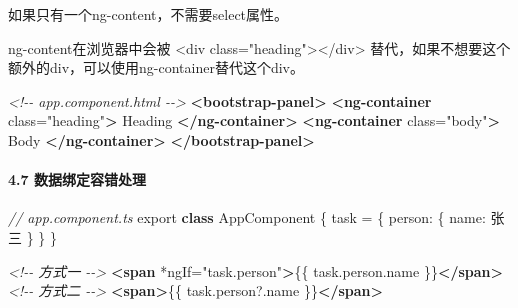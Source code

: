 \documentclass[
]{article}
\newenvironment{Shaded}{}{}
\newcommand{\CommentTok}[1]{\textcolor[rgb]{0.38,0.63,0.69}{\textit{#1}}}
\newcommand{\DataTypeTok}[1]{\textcolor[rgb]{0.56,0.13,0.00}{#1}}
\newcommand{\ImportTok}[1]{#1}
\newcommand{\KeywordTok}[1]{\textcolor[rgb]{0.00,0.44,0.13}{\textbf{#1}}}
\newcommand{\NormalTok}[1]{#1}
\newcommand{\OperatorTok}[1]{\textcolor[rgb]{0.40,0.40,0.40}{#1}}
\newcommand{\OtherTok}[1]{\textcolor[rgb]{0.00,0.44,0.13}{#1}}
\newcommand{\StringTok}[1]{\textcolor[rgb]{0.25,0.44,0.63}{#1}}
\begin{document}
如果只有一个ng-content，不需要select属性。

ng-content在浏览器中会被 \textless{}div
class="heading"\textgreater{}\textless{}/div\textgreater{}
替代，如果不想要这个额外的div，可以使用ng-container替代这个div。

\begin{Shaded}
\begin{Highlighting}[]
\CommentTok{\textless{}!{-}{-} app.component.html {-}{-}\textgreater{}}
\KeywordTok{\textless{}bootstrap{-}panel\textgreater{}}
	\KeywordTok{\textless{}ng{-}container}\OtherTok{ class=}\StringTok{"heading"}\KeywordTok{\textgreater{}}
\NormalTok{        Heading}
    \KeywordTok{\textless{}/ng{-}container\textgreater{}}
    \KeywordTok{\textless{}ng{-}container}\OtherTok{ class=}\StringTok{"body"}\KeywordTok{\textgreater{}}
\NormalTok{        Body}
    \KeywordTok{\textless{}/ng{-}container\textgreater{}}
\KeywordTok{\textless{}/bootstrap{-}panel\textgreater{}}
\end{Highlighting}
\end{Shaded}

\hypertarget{47--ux6570ux636eux7ed1ux5b9aux5bb9ux9519ux5904ux7406}{%
\paragraph{4.7
数据绑定容错处理}\label{47--ux6570ux636eux7ed1ux5b9aux5bb9ux9519ux5904ux7406}}

\begin{Shaded}
\begin{Highlighting}[]
\CommentTok{// app.component.ts}
\ImportTok{export} \KeywordTok{class}\NormalTok{ AppComponent \{}
\NormalTok{    task }\OperatorTok{=}\NormalTok{ \{}
        \DataTypeTok{person}\OperatorTok{:}\NormalTok{ \{}
            \DataTypeTok{name}\OperatorTok{:} \StringTok{\textquotesingle{}张三\textquotesingle{}}
\NormalTok{        \}}
\NormalTok{    \}}
\NormalTok{\}}
\end{Highlighting}
\end{Shaded}

\begin{Shaded}
\begin{Highlighting}[]
\CommentTok{\textless{}!{-}{-} 方式一 {-}{-}\textgreater{}}
\KeywordTok{\textless{}span}\OtherTok{ *ngIf=}\StringTok{"task.person"}\KeywordTok{\textgreater{}}\NormalTok{\{\{ task.person.name \}\}}\KeywordTok{\textless{}/span\textgreater{}}
\CommentTok{\textless{}!{-}{-} 方式二 {-}{-}\textgreater{}}
\KeywordTok{\textless{}span\textgreater{}}\NormalTok{\{\{ task.person?.name \}\}}\KeywordTok{\textless{}/span\textgreater{}}
\end{Highlighting}
\end{Shaded}
\end{document}
